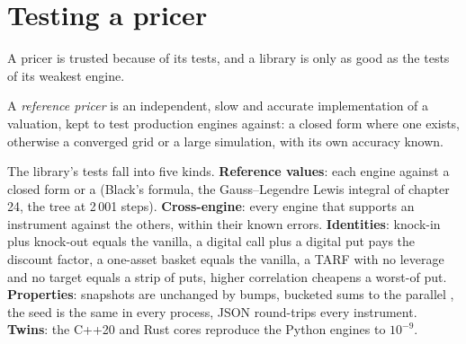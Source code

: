 \begin{omfigure}

\label{fig:dv:build-a-pricing-library:scen}
\end{omfigure}

\section{Testing a pricer}

A pricer is trusted because of its tests, and a library is only as good as the tests of its weakest engine.

\begin{definition}\label{def:dv:build-a-pricing-library:reference}
A \emph{reference pricer} is an independent, slow and accurate implementation of a valuation, kept to test production engines against:
a closed form where one exists, otherwise a converged grid or a large simulation, with its own accuracy known.
\end{definition}

The library's tests fall into five kinds. \textbf{Reference values}: each engine against a closed form or a  (Black's formula, the Gauss--Legendre
Lewis integral of chapter 24, the tree at 2\,001 steps). \textbf{Cross-engine}: every engine that supports an instrument against the others, within their known
errors. \textbf{Identities}: knock-in plus knock-out equals the vanilla, a digital call plus a digital put pays the discount factor, a one-asset basket equals the
vanilla, a TARF with no leverage and no target equals a strip of puts, higher correlation cheapens a worst-of put. \textbf{Properties}: snapshots are unchanged by
bumps, bucketed  sums to the parallel , the seed is the same in every process, JSON round-trips every instrument. \textbf{Twins}: the C++20 and Rust cores
reproduce the Python engines to $10^{-9}$.


